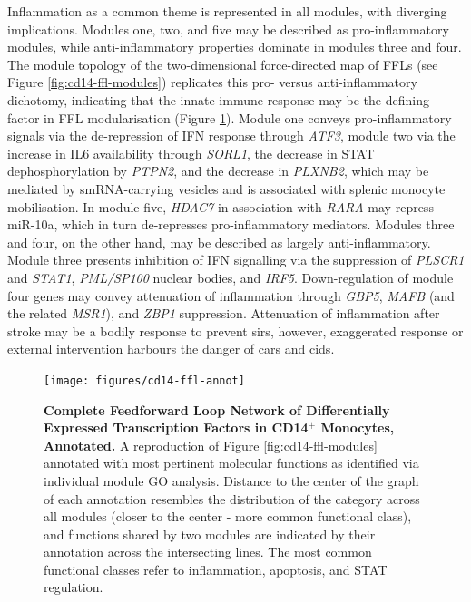 Inflammation as a common theme is represented in all modules, with diverging implications. Modules one, two, and five may be described as pro-inflammatory modules, while anti-inflammatory properties dominate in modules three and four. The module topology of the two-dimensional force-directed map of FFLs (see Figure \ref{fig:cd14-ffl-modules}) replicates this pro- versus anti-inflammatory dichotomy, indicating that the innate immune response may be the defining factor in FFL modularisation (Figure \ref{fig:cd14-ffl-annot}). Module one conveys pro-inflammatory signals via the de-repression of IFN response through \emph{ATF3}, module two via the increase in IL6 availability through \emph{SORL1}, the decrease in STAT dephosphorylation by \emph{PTPN2}, and the decrease in \emph{PLXNB2}, which may be mediated by smRNA-carrying vesicles and is associated with splenic monocyte mobilisation. In module five, \emph{HDAC7} in association with \emph{RARA} may repress miR-10a, which in turn de-represses pro-inflammatory mediators. Modules three and four, on the other hand, may be described as largely anti-inflammatory. Module three presents inhibition of IFN signalling via the suppression of \emph{PLSCR1} and \emph{STAT1}, \emph{PML/SP100} nuclear bodies, and \emph{IRF5}. Down-regulation of module four genes may convey attenuation of inflammation through \emph{GBP5}, \emph{MAFB} (and the related \emph{MSR1}), and \emph{ZBP1} suppression. Attenuation of inflammation after stroke may be a bodily response to prevent \acf{sirs}, however, exaggerated response or external intervention harbours the danger of \acf{cars} and \acf{cids}.

\begin{figure}[t]
\texttt{[image: figures/cd14-ffl-annot]}
\caption[Complete Feedforward Loop Network of Differentially Expressed Transcription Factors in CD14$^+$ Monocytes, Annotated.]{\textbf{Complete Feedforward Loop Network of Differentially Expressed Transcription Factors in CD14$^+$ Monocytes, Annotated.}  A reproduction of Figure \ref{fig:cd14-ffl-modules} annotated with most pertinent molecular functions as identified via individual module GO analysis. Distance to the center of the graph of each annotation resembles the distribution of the category across all modules (closer to the center - more common functional class), and functions shared by two modules are indicated by their annotation across the intersecting lines. The most common functional classes refer to inflammation, apoptosis, and STAT regulation.
\label{fig:cd14-ffl-annot}}
\end{figure}

